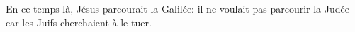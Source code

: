 En ce temps-là, Jésus parcourait la Galilée:
	il ne voulait pas parcourir la Judée car les Juifs cherchaient à le tuer.
